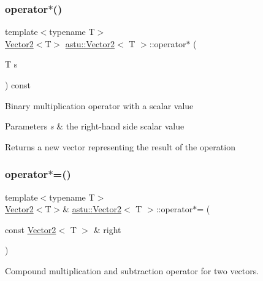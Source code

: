 \subsubsection{\texorpdfstring{operator$\ast$()}{operator*()}\hspace{0.1cm}{\footnotesize\ttfamily [2/2]}}
{\footnotesize\ttfamily template$<$typename T$>$ \\
\hyperlink{classastu_1_1Vector2}{Vector2}$<$T$>$ \hyperlink{classastu_1_1Vector2}{astu\+::\+Vector2}$<$ T $>$\+::operator$\ast$ (\begin{DoxyParamCaption}\item[{T}]{s }\end{DoxyParamCaption}) const\hspace{0.3cm}{\ttfamily [inline]}}

Binary multiplication operator with a scalar value


\begin{DoxyParams}{Parameters}
{\em s} & the right-\/hand side scalar value \\
\hline
\end{DoxyParams}
\begin{DoxyReturn}{Returns}
a new vector representing the result of the operation 
\end{DoxyReturn}
\mbox{\label{classastu_1_1Vector2_a3416fb656aef7113d0261533f5a8a4aa}} 
\subsubsection{\texorpdfstring{operator$\ast$=()}{operator*=()}\hspace{0.1cm}{\footnotesize\ttfamily [1/2]}}
{\footnotesize\ttfamily template$<$typename T$>$ \\
\hyperlink{classastu_1_1Vector2}{Vector2}$<$T$>$\& \hyperlink{classastu_1_1Vector2}{astu\+::\+Vector2}$<$ T $>$\+::operator$\ast$= (\begin{DoxyParamCaption}\item[{const \hyperlink{classastu_1_1Vector2}{Vector2}$<$ T $>$ \&}]{right }\end{DoxyParamCaption})\hspace{0.3cm}{\ttfamily [inline]}}

Compound multiplication and subtraction operator for two vectors.

